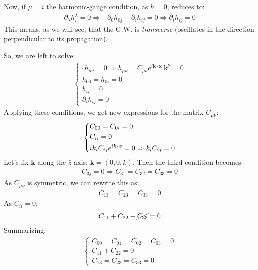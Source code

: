 \documentclass[../template.tex]{subfiles}
\begin{document}
\medskip

Now, if $\mu = i$ the harmonic-gauge condition, as $h=0$, reduces to:
\begin{align*}
    \partial_\lambda h^\lambda_i = 0 \Rightarrow -\partial_0 h_{0j} + \partial_i h_{ij} = 0 \Rightarrow \partial_i h_{ij} = 0
\end{align*}
This means, as we will see, that the G.W. is \textit{transverse} (oscillates in the direction perpendicular to its propagation).

\medskip

So, we are left to solve:
\begin{align*}
    \begin{cases}
        \square h_{\mu \nu} = 0 \Rightarrow h_{\mu \nu} = C_{\mu \nu} e^{i\bm{k}\cdot \bm{x}} \> \bm{k}^2 = 0\\
        h_{00} = h_{0i} = 0\\
        h_{i i} =  0\\
        \partial_i h_{ij} = 0
    \end{cases}
\end{align*}
Applying these conditions, we get new expressions for the matrix $C_{\mu \nu}$:
\begin{align*}
    \begin{dcases}
        C_{00} = C_{0i} = 0\\
        C_{i i} = 0\\
        i k_i C_{ij} e^{i\bm{k} \cdot \bm{x}} = 0 \Rightarrow k_i C_{ij} = 0
    \end{dcases}
\end{align*}
Let's fix $\bm{k}$ along the $\hat{z}$ axis: $\bm{k} = (0,0,k)$. Then the third condition becomes:
\begin{align*}
    C_{3j} = 0 \Rightarrow C_{31} = C_{32} = C_{33} = 0
\end{align*}
As $C_{\mu \nu}$ is symmetric, we can rewrite this as:
\begin{align*}
    C_{13} = C_{23} = C_{33} = 0
\end{align*}
As $C_{i i} = 0$:
\begin{align*}
    C_{11} + C_{22} + \cancel{C_{33}} = 0
\end{align*}
Summarizing:
\begin{align*}
    \begin{cases}
        C_{00} = C_{01} = C_{02} = C_{03} = 0\\
        C_{11} + C_{22} = 0\\
        C_{13} = C_{23} = C_{33} = 0
    \end{cases}
\end{align*}
\end{document}
